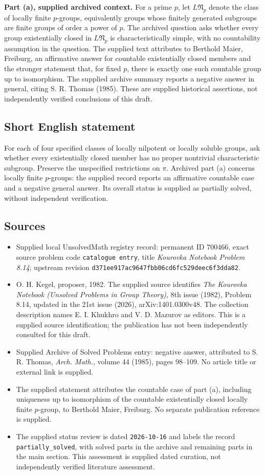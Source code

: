 \documentclass[11pt]{article}
\begin{document}
\textbf{Part (a), supplied archived context.} For a prime \(p\), let \(L\mathfrak N_p\) denote the class of locally finite \(p\)-groups, equivalently groups whose finitely generated subgroups are finite groups of order a power of \(p\). The archived question asks whether every group existentially closed in \(L\mathfrak N_p\) is characteristically simple, with no countability assumption in the question. The supplied text attributes to Berthold Maier, Freiburg, an affirmative answer for countable existentially closed members and the stronger statement that, for fixed \(p\), there is exactly one such countable group up to isomorphism. The supplied archive summary reports a negative answer in general, citing S. R. Thomas (1985). These are supplied historical assertions, not independently verified conclusions of this draft.
\subsection{Short English statement}
For each of four specified classes of locally nilpotent or locally soluble groups, ask whether every existentially closed member has no proper nontrivial characteristic subgroup. Preserve the unspecified restrictions on \(\pi\). Archived part (a) concerns locally finite \(p\)-groups: the supplied record reports an affirmative countable case and a negative general answer. Its overall status is supplied as partially solved, without independent verification.
\subsection{Sources}
\begin{itemize}
\item Supplied local UnsolvedMath registry record: permanent ID \(700466\), exact source problem code \texttt{catalogue entry}, title \emph{Kourovka Notebook Problem 8.14}; upstream revision \texttt{d371ee917ac9647fbb06cd6fc529deec6f3dda82}.
\item O. H. Kegel, proposer, 1982. The supplied source identifies \emph{The Kourovka Notebook (Unsolved Problems in Group Theory)}, 8th issue (1982), Problem 8.14, updated in the 21st issue (2026), arXiv:1401.0300v48. The collection description names E. I. Khukhro and V. D. Mazurov as editors. This is a supplied source identification; the publication has not been independently consulted for this draft.
\item Supplied Archive of Solved Problems entry: negative answer, attributed to S. R. Thomas, \emph{Arch. Math.}, volume 44 (1985), pages 98--109. No article title or external link is supplied.
\item The supplied statement attributes the countable case of part (a), including uniqueness up to isomorphism of the countable existentially closed locally finite \(p\)-group, to Berthold Maier, Freiburg. No separate publication reference is supplied.
\item The supplied status review is dated \texttt{2026-10-16} and labels the record \texttt{partially\_solved}, with solved parts in the archive and remaining parts in the main section. This assessment is supplied dated curation, not independently verified literature assessment.
\end{itemize}
\end{document}
